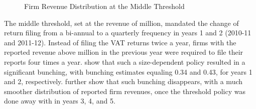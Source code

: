 \begin{figure}[ht!]
{    \label{fig:MiddleThreshold-E}
  }
  \caption{Firm Revenue Distribution at the Middle Threshold}
  \label{fig:MiddleThreshold}
 \end{figure}

The middle threshold, set at the revenue of  million, mandated the change of return filing from a bi-annual to a quarterly frequency in years 1 and 2 (2010-11 and 2011-12). Instead of filing the VAT returns twice a year, firms with the reported revenue above  million in the previous year were required to file their reports four times a year.  show that such a size-dependent policy resulted in a significant bunching, with bunching estimates equaling 0.34 and 0.43, for years 1 and 2, respectively.  further show that such bunching disappears, with a much smoother distribution of reported firm revenues, once the threshold policy was done away with in years 3, 4, and 5.

